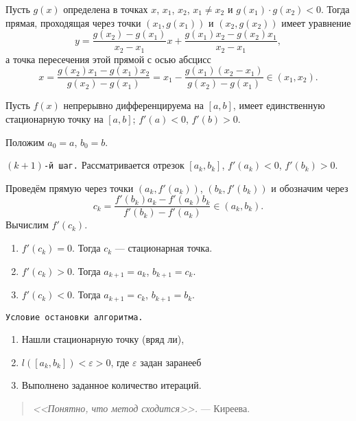 \begin{alg}
  \begin{remark*} Пусть $ g(x) $ определена в точках $ x $, $ x_1 $, $ x_2 $, $
    x_1 \neq x_2 $ и $ g(x_1)\cdot g(x_2) < 0 $. Тогда прямая, проходящая через
    точки $ (x_1, g(x_1)) $ и $ (x_2, g(x_2)) $ имеет уравнение  
    \[
        y = \frac{g(x_2) - g(x_1)}{x_2 - x_1} x + \frac{g(x_1)x_2 -
        g(x_2)x_1}{x_2 - x_1},
    \]
   а точка пересечения этой прямой с осью абсцисс  
   \[
       x = \frac{g(x_2)x_1 - g(x_1)x_2}{g(x_2) - g(x_1)} = x_1 -
       \frac{g(x_1)(x_2-x_1)}{g(x_2) - g(x_1)} \in (x_1, x_2).
   \]
 \end{remark*}

 Пусть $ f(x) $ непрерывно дифференцируема на $ [a,b] $, имеет единственную
 стационарную точку на $ [a, b] $; $ f'(a) < 0 $, $ f'(b) > 0 $.

 Положим $ a_0 = a $, $ b_0 = b $.

 \texttt{$ (k+1) $-й шаг.} Рассматривается отрезок $ [a_k, b_k] $, $ f'(a_k) < 0
 $, $ f'(b_k) > 0 $. 

 Проведём прямую через точки $ (a_k, f'(a_k)) $, $ (b_k, f'(b_k)) $ и обозначим
 через 
 \[
     c_k = \frac{f'(b_k)a_k - f'(a_k)b_k}{f'(b_k) - f'(a_k)} \in (a_k, b_k).
 \]
Вычислим $ f'(c_k) $.
\begin{enumerate}[label=(\roman*).]
  \item $f'(c_k) = 0$. Тогда $ c_k  $ --- стационарная точка.
  \item $ f'(c_k) > 0 $. Тогда $ a_{k+1} = a_k $, $ b_{k+1} = c_k $.
  \item $ f'(c_k) < 0 $. Тогда $ a_{k+1} = c_k $, $ b_{k+1} = b_k $.
\end{enumerate}

\texttt{Условие остановки алгоритма.}
\begin{enumerate}[label=(\alph*)]
  \item Нашли стационарную точку (вряд ли),
  \item $ l([a_k, b_k]) < \varepsilon > 0$, где $ \varepsilon $ задан заранееб
  \item Выполнено заданное количество итераций.
\end{enumerate}

\begin{quotation}
  \emph{<<Понятно, что метод сходится>>.}
  \flushbottom --- Киреева.
\end{quotation}
\end{alg}

